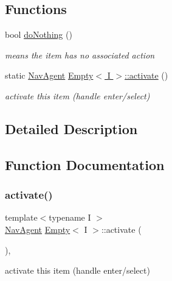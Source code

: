 \subsection*{Functions}
\begin{DoxyCompactItemize}
\item 
bool \hyperlink{group__Agents_ga34d052b903454a7ceda33b9506513683}{do\+Nothing} ()
\begin{DoxyCompactList}\small\item\em means the item has no associated action \end{DoxyCompactList}\item 
static \hyperlink{structNavAgent}{Nav\+Agent} \hyperlink{group__Agents_gade3cccf531dad6fe907c3a9764204e1c}{Empty$<$ I $>$\+::activate} ()
\begin{DoxyCompactList}\small\item\em activate this item (handle enter/select) \end{DoxyCompactList}\end{DoxyCompactItemize}


\subsection{Detailed Description}


\subsection{Function Documentation}
\mbox{\label{group__Agents_gade3cccf531dad6fe907c3a9764204e1c}} 
\subsubsection{\texorpdfstring{activate()}{activate()}}
{\footnotesize\ttfamily template$<$typename I $>$ \\
\hyperlink{structNavAgent}{Nav\+Agent} \hyperlink{structEmpty}{Empty}$<$ I $>$\+::activate (\begin{DoxyParamCaption}{ }\end{DoxyParamCaption})\hspace{0.3cm}{\ttfamily [inline]}, {\ttfamily [static]}}



activate this item (handle enter/select) 

